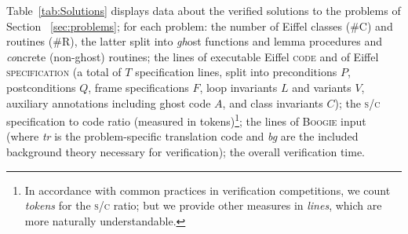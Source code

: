 Table~\ref{tab:Solutions} displays data about the verified solutions to the problems of Section~ \ref{sec:problems}; for each problem: the number of Eiffel classes (\textsc{\#C}) and routines (\textsc{\#R}), the latter split into \textit{gh}ost functions and lemma procedures and \textit{co}ncrete (non-ghost) routines; the lines of executable Eiffel \textsc{code} and of Eiffel \textsc{specification} (a total of $T$ specification lines, split into preconditions $P$, postconditions $Q$, frame specifications $F$, loop invariants $L$ and variants $V$, auxiliary annotations including ghost code $A$, and class invariants $C$); the \textsc{s}/\textsc{c} specification to code ratio (measured in tokens)\footnote{In accordance with common practices in verification competitions, we count \emph{tokens} for the \textsc{s}/\textsc{c} ratio; but we provide other measures in \emph{lines}, which are more naturally understandable.}; the lines of \textsc{Boogie} input (where \textit{tr} is the problem-specific translation code and \textit{bg} are the included background theory necessary for verification); the overall verification time.


